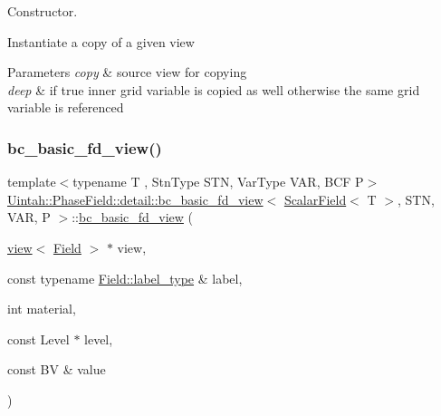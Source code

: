 Constructor. 

Instantiate a copy of a given view


\begin{DoxyParams}{Parameters}
{\em copy} & source view for copying \\
\hline
{\em deep} & if true inner grid variable is copied as well otherwise the same grid variable is referenced \\
\hline
\end{DoxyParams}
\mbox{\label{classUintah_1_1PhaseField_1_1detail_1_1bc__basic__fd__view_3_01ScalarField_3_01T_01_4_00_01STN_00_01VAR_00_01P_01_4_a71f5d2796724efaaf5e046f86e780aea}} 
\subsubsection{\texorpdfstring{bc\+\_\+basic\+\_\+fd\+\_\+view()}{bc\_basic\_fd\_view()}\hspace{0.1cm}{\footnotesize\ttfamily [2/4]}}
{\footnotesize\ttfamily template$<$typename T , Stn\+Type S\+TN, Var\+Type V\+AR, B\+CF P$>$ \\
\hyperlink{classUintah_1_1PhaseField_1_1detail_1_1bc__basic__fd__view}{Uintah\+::\+Phase\+Field\+::detail\+::bc\+\_\+basic\+\_\+fd\+\_\+view}$<$ \hyperlink{structUintah_1_1PhaseField_1_1ScalarField}{Scalar\+Field}$<$ T $>$, S\+TN, V\+AR, P $>$\+::\hyperlink{classUintah_1_1PhaseField_1_1detail_1_1bc__basic__fd__view}{bc\+\_\+basic\+\_\+fd\+\_\+view} (\begin{DoxyParamCaption}\item[{\hyperlink{classUintah_1_1PhaseField_1_1detail_1_1view}{view}$<$ \hyperlink{structUintah_1_1PhaseField_1_1ScalarField}{Field} $>$ $\ast$}]{view,  }\item[{const typename \hyperlink{structUintah_1_1PhaseField_1_1ScalarField_a7a77875e030da64c47ce9f6c22a06959}{Field\+::label\+\_\+type} \&}]{label,  }\item[{int}]{material,  }\item[{const Level $\ast$}]{level,  }\item[{const BV \&}]{value }\end{DoxyParamCaption})\hspace{0.3cm}{\ttfamily [inline]}}



